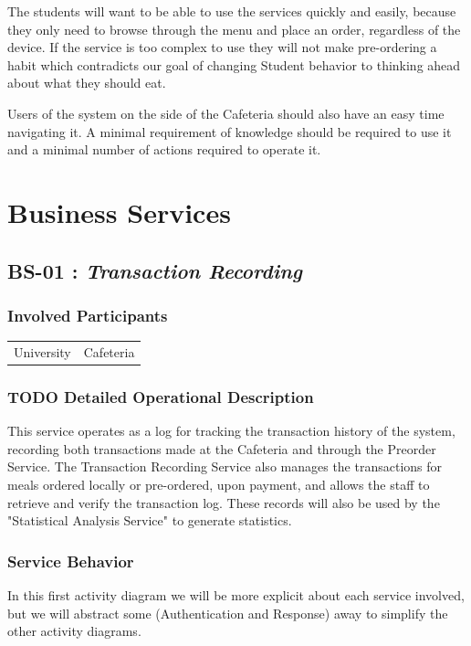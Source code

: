 \documentclass[11pt]{article}
\begin{document}
The students will want to be able to use the services quickly and
easily, because they only need to browse through the menu and place
an order, regardless of the device. If the service is too complex
to use they will not make pre-ordering a habit which contradicts
our goal of changing Student behavior to thinking ahead about what
they should eat.

Users of the system on the side of the Cafeteria should also have
an easy time navigating it. A minimal requirement of knowledge
should be required to use it and a minimal number of actions
required to operate it.
\section{Business Services}
\label{sec:orgaf0c428}
\subsection{\label{org24bb3d2}BS-01 : \emph{Transaction Recording}}
\label{sec:orge3444f1}
\subsubsection{Involved Participants}
\label{sec:org99e28da}
\begin{center}
\begin{tabular}{ll}
University & Cafeteria\\
\end{tabular}
\end{center}
\subsubsection{{\bfseries\sffamily TODO} Detailed Operational Description}
\label{sec:orgaf5026b}
This service operates as a log for tracking the transaction
history of the system, recording both transactions made at the
Cafeteria and through the Preorder Service. The Transaction
Recording Service also manages the transactions for meals ordered
locally or pre-ordered, upon payment, and allows the staff to
retrieve and verify the transaction log. These records will also
be used by the "Statistical Analysis Service" to generate
statistics.
\subsubsection{Service Behavior}
\label{sec:org96d976d}
In this first activity diagram we will be more explicit about each
service involved, but we will abstract some (Authentication and
Response) away to simplify the other activity diagrams.
\end{document}
